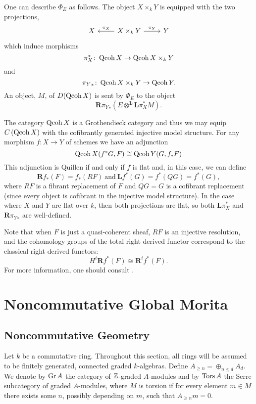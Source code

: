 \documentclass[reqno, 12pt]{amsart}
\begin{document}
One can describe $\Phi_E$ as follows.
The object $X \times_k Y$ is equipped with the two projections,
$$\begin{tikzcd}
  X  & X \times_k Y \arrow[swap]{l}{\pi_X}\arrow{r}{\pi_Y}& Y
\end{tikzcd}$$
which induce morphisms
$$\pi_X^\ast \colon \operatorname{Qcoh}X \to \operatorname{Qcoh}X \times_k Y$$
and
$${\pi_{Y}}_\ast \colon \operatorname{Qcoh}X \times_k Y \to \operatorname{Qcoh}Y.$$
An object, $M$, of $D(\operatorname{Qcoh}X)$ is sent by $\Phi_E$ to the object
$$\mathbf{R}{\pi_Y}_\ast \left(E \otimes^{\mathbf{L}} \mathbf{L}\pi_X^\ast M\right).$$

\begin{remark}
  The category $\operatorname{Qcoh}X$ is a Grothendieck category and thus we may equip $C\left(\operatorname{Qcoh}X\right)$ with the cofibrantly generated injective model structure.
  For any morphism $f \colon X \to Y$ of schemes we have an adjunction
  $$\operatorname{Qcoh}X(f^\ast G, F) \cong \operatorname{Qcoh}Y(G,f_\ast F)$$
  This adjunction is Quillen if and only if $f$ is flat and, in this case, we can define
  $$\mathbf{R}f_\ast(F) = f_\ast(RF)\ \text{and}\ \mathbf{L}f^\ast(G) = f^\ast(QG) = f^\ast(G),$$
  where $RF$ is a fibrant replacement of $F$ and $QG = G$ is a cofibrant replacement (since every object is cofibrant in the injective model structure).
  In the case where $X$ and $Y$ are flat over $k$, then both projections are flat, so both $\mathbf{L}\pi_X^\ast$ and $\mathbf{R}{\pi_Y}_\ast$ are well-defined.

  Note that when $F$ is just a quasi-coherent sheaf, $RF$ is an injective resolution, and the cohomology groups of the total right derived functor correspond to the classical right derived functors:
  $$H^i\mathbf{R}f^\ast(F) \cong \mathbf{R}^i f^\ast (F).$$
  For more information, one should consult \cite{Hov01}.
  
\end{remark}
\section{Noncommutative Global Morita}

\subsection{Noncommutative Geometry}
Let $k$ be a commutative ring.
Throughout this section, all rings will be assumed to be finitely generated, connected graded \(k\)-algebras.
Define $A_{\geq n} = \oplus_{n \leq d} A_d$.
We denote by $\operatorname{Gr}A$ the category of $\mathbb{Z}$-graded $A$-modules and by $\operatorname{Tors}A$ the Serre subcategory of graded $A$-modules, where $M$ is torsion if for every element $m \in M$ there exists some $n$, possibly depending on $m$, such that $A_{\geq n}m = 0$.
\end{document}
